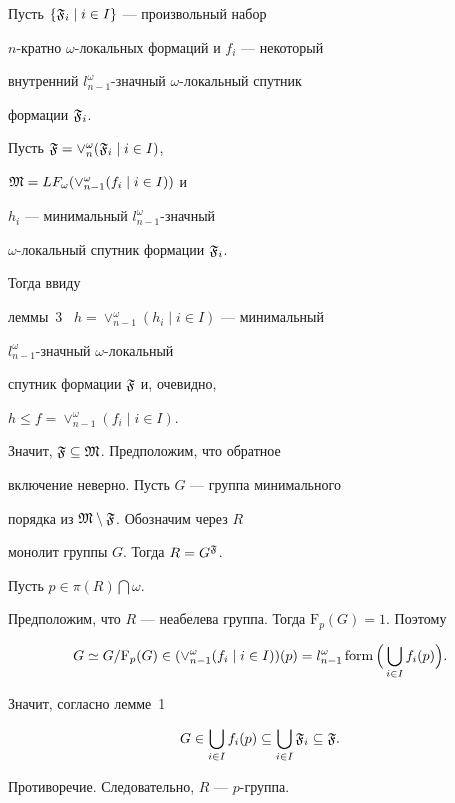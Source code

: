 \begin{pf}


Пусть $\{\frak{F}_i\mid i\in I\}$ --- произвольный набор


$n$-кратно $\omega$-локальных формаций и $f_i$ --- некоторый


внутренний $l^{\omega}_{n-1}$-значный $\omega$-локальный спутник


формации $\frak{F}_i$.


Пусть $\frak{F}=\vee_{n}^{\omega}(\frak{F}_i\mid i\in I)$,


$\frak{M}=LF_{\omega}(\vee_{n-1}^{\omega}(f_i\mid i\in I))$ и


$h_i$ --- минимальный $l^{\omega}_{n-1}$-значный


$\omega$-локальный спутник формации $\frak{F}_i$.


Тогда ввиду


леммы~3 \ $h=\vee_{n-1}^{\omega}(h_i\mid i\in I)$ --- минимальный


$l_{n-1}^{\omega}$-значный $\omega$-локальный


спутник формации $\frak{F}$ и, очевидно,


$h\le f=\vee_{n-1}^{\omega}(f_i\mid i\in I)$.


Значит, $\frak{F}\subseteq\frak{M}$. Предположим, что обратное


включение неверно. Пусть $G$ --- группа минимального


порядка из $\frak{M}\setminus\frak{F}$. Обозначим через $R$


монолит группы $G$. Тогда $R=G^{\frak{F}}$.


Пусть $p\in\pi(R)\bigcap\omega$.





Предположим, что $R$ --- неабелева группа. Тогда ${\mathrm F}_p(G)=1$. Поэтому


$$


G\simeq G/{\mathrm F}_p(G)\in(\vee_{n-1}^{\omega}


(f_i\mid i\in I))(p)=l^{\omega}_{n-1}\form \Big(\bigcup_{i\in I}f_i(p)\Big).


$$


Значит, согласно лемме~1


$$


G\in\bigcup_{i\in I}f_i(p)\subseteq\bigcup_{i\in I}


\frak{F}_i\subseteq\frak{F}.


$$


Противоречие. Следовательно, $R$ --- $p$-группа.



\end{pf}
